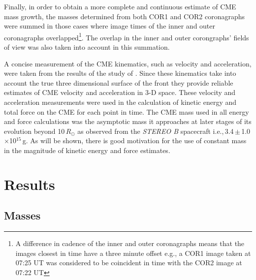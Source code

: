 Finally, in order to obtain a more complete and continuous estimate of CME mass growth, the masses determined from both COR1 and COR2 coronagraphs were summed in those cases where image times of the inner and outer coronagraphs overlapped\footnote{A difference in cadence of the inner and outer coronagraphs means that the images closest in time have a three minute offset e.g., a COR1 image taken at 07:25 UT was considered to be coincident in time with the COR2 image at 07:22 UT}. The overlap in the inner and outer corongraphs' fields of view was also taken into account in this summation.


A concise measurement of the CME kinematics, such as velocity and acceleration, were taken from the results of the study of \citet{byr10}. Since these kinematics take into account the true three dimensional surface of the front they provide reliable estimates of CME velocity and acceleration in 3-D space. These velocity and acceleration measurements were used in the calculation of kinetic energy and total force on the CME for each point in time. The CME mass used in all energy and force calculations was the asymptotic mass it approaches at later stages of its evolution beyond 10\,$R_{\odot}$ as observed from the \emph{STEREO B} spacecraft i.e.,\,3.4\,$\pm$\,1.0$\times$10$^{15}$\,g. As will be shown, there is 
good motivation for the use of constant mass in the magnitude of kinetic energy and force estimates. 


\section{Results}\label{sec:11}
\subsection{Masses}

